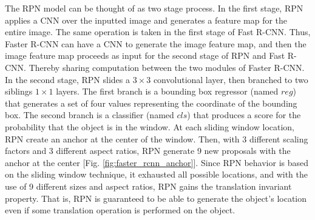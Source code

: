 The RPN model can be thought of as two stage process. In the first stage, RPN applies a CNN over the inputted image and generates a feature map for the entire image. The same operation is taken in the first stage of Fast R-CNN. Thus, Faster R-CNN can have a CNN to generate the image feature map, and then the image feature map proceeds as input for the second stage of RPN and Fast R-CNN. Thereby sharing computation between the two modules of Faster R-CNN. In the second stage, RPN slides a $3 \times 3$ convolutional layer, then branched to two siblings $1 \times 1$ layers. The first branch is a bounding box regressor (named $reg$) that generates a set of four values representing the coordinate of the bounding box. The second branch is a classifier (named $cls$) that produces a score for the probability that the object is in the window. At each sliding window location, RPN create an anchor at the center of the window. Then, with 3 different scaling factors and 3 different aspect ratios, RPN generate 9 new proposals with the anchor at the center [Fig. \ref{fig:faster_rcnn_anchor}]. Since RPN behavior is based on the sliding window technique, it exhausted all possible locations, and with the use of 9 different sizes and aspect ratios, RPN gains the translation invariant property. That is, RPN is guaranteed to be able to generate the object's location even if some translation operation is performed on the object.

